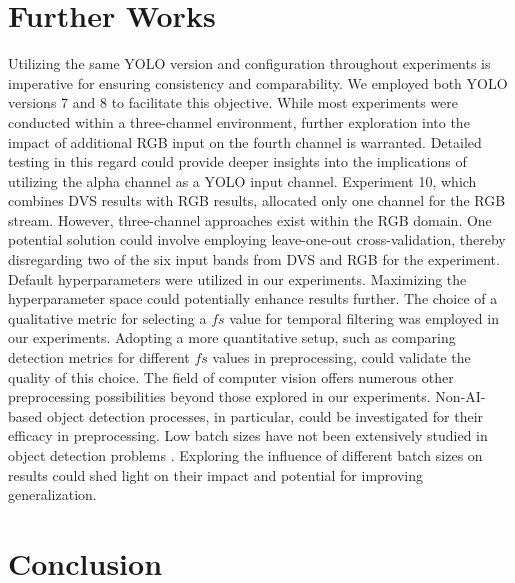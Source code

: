 \documentclass[sigchi,screen]{acmart}
\begin{document}
\section{Further Works}
Utilizing the same YOLO version and configuration throughout experiments is imperative for ensuring consistency and comparability. We employed both YOLO versions 7 and 8 to facilitate this objective. While most experiments were conducted within a three-channel environment, further exploration into the impact of additional RGB input on the fourth channel is warranted. Detailed testing in this regard could provide deeper insights into the implications of utilizing the alpha channel as a YOLO input channel. Experiment 10, which combines DVS results with RGB results, allocated only one channel for the RGB stream. However, three-channel approaches exist within the RGB domain. One potential solution could involve employing leave-one-out cross-validation, thereby disregarding two of the six input bands from DVS and RGB for the experiment. Default hyperparameters were utilized in our experiments. Maximizing the hyperparameter space could potentially enhance results further. The choice of a qualitative metric for selecting a $fs$ value for temporal filtering was employed in our experiments. Adopting a more quantitative setup, such as comparing detection metrics for different $fs$ values in preprocessing, could validate the quality of this choice. The field of computer vision offers numerous other preprocessing possibilities beyond those explored in our experiments. Non-AI-based object detection processes, in particular, could be investigated for their efficacy in preprocessing. Low batch sizes have not been extensively studied in object detection problems \cite{Peng_2018_CVPR}. Exploring the influence of different batch sizes on results could shed light on their impact and potential for improving generalization.
\section{Conclusion}
\end{document}
